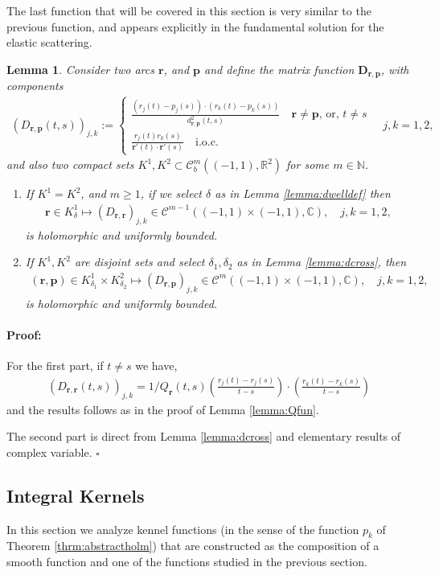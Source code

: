 \documentclass{article}
\newtheorem{lemma}[theorem]{Lemma}
\newenvironment{proof}{\paragraph{Proof:}}{\hfill$\square$}
\newcommand{\IC}{{\mathbb C}}
\newcommand{\IN}{{\mathbb N}}
\newcommand{\IR}{{\mathbb R}}
\newcommand{\bp}{{\bm p}}
\newcommand{\cmspace}[3]{\mathcal{C}^{#1} \left( #2, #3 \right)}
\newcommand{\rgeo}[1]{\mathcal{C}_b^{#1}\left( (-1,1), \IR^2 \right)}
\newcommand{\br}{\bm{r}}
\begin{document}
The last function that will be covered in this section is very similar to the previous function, and appears explicitly in the fundamental solution for the elastic scattering.

\begin{lemma}
\label{lemma:Dmatrix}
Consider two arcs $\br$, and $\bp$ and define the matrix function $\mathbf{D}_{\br,\bp}$, with components
\begin{align*}
(D_{\br,\bp}(t,s))_{j,k} :=  \begin{cases}
\frac{(r_j(t)-p_j(s))\cdot (r_k(t)-p_k(s))}{d_{\br,\bp}^2(t,s)} \quad \br \neq \bp\text{, or, } t \neq s \\
\frac{r_j(t) r_k(s)}{\br'(t)\cdot \br'(s)} \quad \text{i.o.c.} 
\end{cases} \quad j,k=1,2,
\end{align*} 
and also two compact sets $K^1,K^2 \subset \rgeo{m}$ for some $m \in \IN$. 
\begin{enumerate}
\item
If $K^1 = K^2$, and $m \geq 1$, if we select $\delta$ as in Lemma \ref{lemma:dwelldef} then 
\begin{align*}
\br \in K^1_\delta \mapsto ({D}_{\br,\br})_{j,k} \in \cmspace{m-1}{(-1,1)\times(-1,1)}{\IC}, \quad j,k =1,2,
\end{align*} 
is holomorphic and uniformly bounded.
\item 
If $K^1, K^2$ are disjoint sets and select $\delta_1, \delta_2$ as in Lemma \ref{lemma:dcross}, then 
\begin{align*}
(\br,\bp)  \in K^1_{\delta_1} \times K^2_{\delta_2} \mapsto ({D}_{\br,\bp})_{j,k} \in \cmspace{m}{(-1,1)\times(-1,1)}{\IC}, \quad j,k =1,2,
\end{align*} 
is holomorphic and uniformly bounded.
\end{enumerate}
\end{lemma} 
\begin{proof}
For the first part, if $t \neq s$ we have, 
\begin{align*}
(D_{\br,\br}(t,s))_{j,k} = 1/Q_{\br}(t,s) \left( \frac{r_j(t)-r_j(s)}{t-s} \right) \cdot \left( \frac{r_k(t)-r_k(s)}{t-s} \right)
\end{align*}
and the results follows as in the proof of Lemma \ref{lemma:Qfun}.

The second part is direct from Lemma \ref{lemma:dcross} and elementary results of complex variable. 
\end{proof}
\subsection{Integral Kernels}
In this section we analyze kennel functions (in the sense of the function $p_k$ of Theorem \ref{thrm:abstractholm}) that are constructed as the composition of a smooth function and one of the functions studied in the previous section. 
\end{document}

